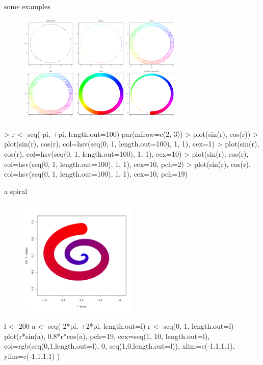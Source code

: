 \documentclass[pdf]{beamer}
\begin{document}
\begin{frame}[fragile]{some examples}
  \begin{figure}[ht]
    \includegraphics[width=0.7\textwidth]{images/circles.pdf}
  \end{figure}
  \begin{rcode}
    > r <- seq(-pi, +pi, length.out=100)
    par(mfrow=c(2, 3))
    > plot(sin(r), cos(r))
    > plot(sin(r), cos(r), col=hsv(seq(0, 1, length.out=100), 1, 1), cex=1)                            
    > plot(sin(r), cos(r), col=hsv(seq(0, 1, length.out=100), 1, 1), cex=10)
    > plot(sin(r), cos(r), col=hsv(seq(0, 1, length.out=100), 1, 1), cex=10, pch=2)
    > plot(sin(r), cos(r), col=hsv(seq(0, 1, length.out=100), 1, 1), cex=10, pch=19)
  \end{rcode}
\end{frame}

\begin{frame}[fragile]{a spiral}
  \begin{figure}[ht]
    \includegraphics[width=0.5\textwidth]{images/spiral}
  \end{figure}
  \begin{rcode}
    l <- 200
    a <- seq(-2*pi, +2*pi, length.out=l)
    r <- seq(0, 1, length.out=l)
    plot(r*sin(a), 0.8*r*cos(a), pch=19, cex=seq(1, 10, length.out=l),
         col=rgb(seq(0,1,length.out=l), 0, seq(1,0,length.out=l)), xlim=c(-1.1,1.1),
         ylim=c(-1.1,1.1) )
  \end{rcode}
  
\end{frame}
\end{document}
